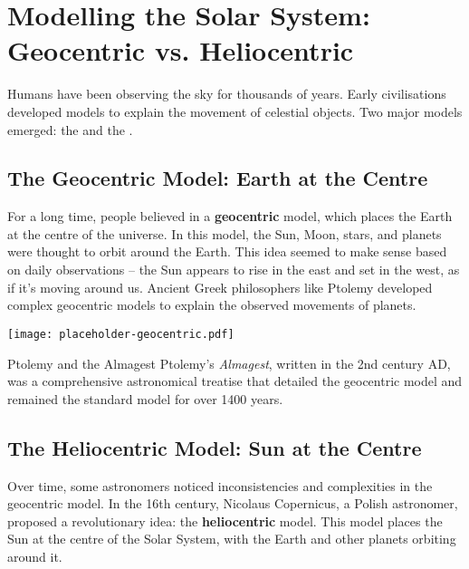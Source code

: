 \section{Modelling the Solar System: Geocentric vs. Heliocentric}

Humans have been observing the sky for thousands of years.  Early civilisations developed models to explain the movement of celestial objects.  Two major models emerged: the  and the .

\subsection{The Geocentric Model: Earth at the Centre}

For a long time, people believed in a \textbf{geocentric} model, which places the Earth at the centre of the universe.  In this model, the Sun, Moon, stars, and planets were thought to orbit around the Earth.  This idea seemed to make sense based on daily observations – the Sun appears to rise in the east and set in the west, as if it's moving around us.  Ancient Greek philosophers like Ptolemy developed complex geocentric models to explain the observed movements of planets.

\begin{marginfigure}
\texttt{[image: placeholder-geocentric.pdf]}
\caption{\label{fig:geocentric}A simplified diagram of the geocentric model. \textit{Image to be added.}}
\end{marginfigure}

\begin{historylink}{Ptolemy and the Almagest}
Ptolemy's \textit{Almagest}, written in the 2nd century AD, was a comprehensive astronomical treatise that detailed the geocentric model and remained the standard model for over 1400 years.
\end{historylink}


\subsection{The Heliocentric Model: Sun at the Centre}

Over time, some astronomers noticed inconsistencies and complexities in the geocentric model. In the 16th century, Nicolaus Copernicus, a Polish astronomer, proposed a revolutionary idea: the \textbf{heliocentric} model. This model places the Sun at the centre of the Solar System, with the Earth and other planets orbiting around it.

